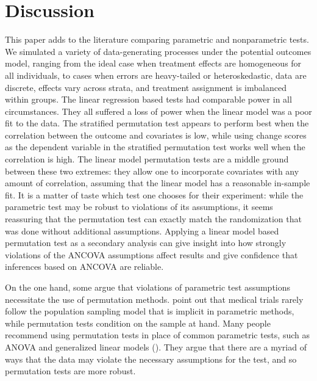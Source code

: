 \documentclass[12pt]{article}
\begin{document}
\section{Discussion}\label{sec:discussion}



This paper adds to the literature comparing parametric and nonparametric tests.
We simulated a variety of data-generating processes under the potential outcomes model, ranging from the ideal case when treatment effects are homogeneous for all individuals, to cases when errors are heavy-tailed or heteroskedastic, data are discrete, effects vary across strata, and treatment assignment is imbalanced within groups.
The linear regression based tests had comparable power in all circumstances.
They all suffered a loss of power when the linear model was a poor fit to the data.
The stratified permutation test appears to perform best when the correlation between the outcome and covariates is low, while using change scores as the dependent variable in the stratified permutation test works well when the correlation is high.
The linear model permutation tests are a middle ground between these two extremes: they allow one to incorporate covariates with any amount of correlation, assuming that the linear model has a reasonable in-sample fit.
It is a matter of taste which test one chooses for their experiment: while the parametric test may be robust to violations of its assumptions, it seems reassuring that the permutation test can exactly match the randomization that was done without additional assumptions.
Applying a linear model based permutation test as a secondary analysis can give insight into how strongly violations of the ANCOVA assumptions affect results
and give confidence that inferences based on ANCOVA are reliable.


On the one hand, some argue that violations of parametric test assumptions necessitate the use of permutation methods.
\cite{ludbrook_why_1998} point out that medical trials rarely follow the population sampling model that is implicit in parametric methods, while permutation tests condition on the sample at hand.
Many people recommend using permutation tests in place of common parametric tests, such as ANOVA and generalized linear models (\cite{still_approximate_1981, winkler_permutation_2014}).
They argue that there are a myriad of ways that the data may violate the necessary assumptions for the test, and so permutation tests are more robust.
\end{document}
